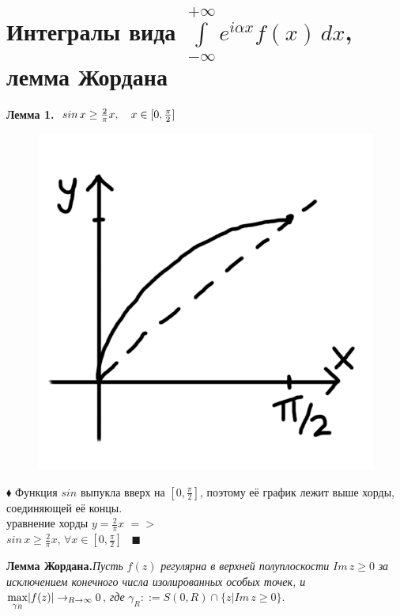 \documentclass[a4paper, 12pt]{report}
\begin{document}
\section{Интегралы вида $\int\limits_{-\infty}^{+\infty}e^{i\alpha x} f(x)\, dx$, лемма Жордана}
\par \textbf{Лемма 1.} $\ sin\,x \ge \frac{2}{\pi}x, \quad x \in [0, \frac{\pi}{2}]\\ $ 
\bigskip
\begin{figure} 
    \vspace{-6ex}
    \includegraphics{jordan/1int.png}
\end{figure}
$\blacklozenge$ Функция $sin$ выпукла вверх на $[0, \frac{\pi}{2}]$, поэтому её график лежит выше хорды, соединяющей её концы.
\\ уравнение хорды \quad $y = \frac{2}{\pi}x$ \quad $=>$
\\ $sin\,x \ge \frac{2}{\pi}x$, \quad $\forall x \in [0, \frac{\pi}{2}]$ \ 
$\blacksquare$
\bigskip\bigskip\bigskip\par
\textbf{Лемма Жордана.}\quad \textit{Пусть} $f(z)$ \textit{регулярна в верхней полуплоскости} $Im\,z \ge 0$ \textit{за исключением конечного числа изолированных особых точек, и }
$\smash{\displaystyle\max_{\gamma_{R}}} |f(z)| \rightarrow_{R \rightarrow \infty} 0$, \textit{где} $\gamma_R ::= S(0, R) \cap {\{z|Im\,z \ge 0}\}$.
\end{document}
